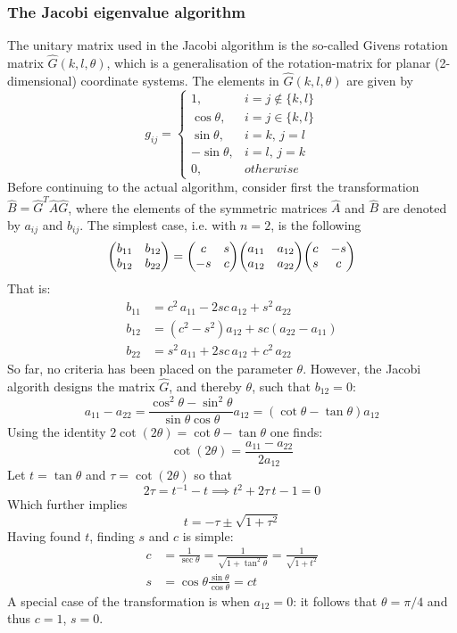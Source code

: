 \documentclass[reprint,english]{revtex4-1}
\begin{document}
\subsubsection{The Jacobi eigenvalue algorithm}
The unitary matrix used in the Jacobi algorithm is the so-called Givens rotation matrix \(\hat{G}(k,l,\theta)\), which is a generalisation of the rotation-matrix for planar (2-dimensional) coordinate systems. The elements in \(\hat{G}(k,l,\theta)\) are given by
\begin{equation}\label{eq:Givens_rotation_matrix}
g_{ij}=\begin{cases}1,&i=j\notin\{k,l\} \\ \cos\theta,&i=j\in\{k,l\} \\ \sin\theta,&i=k,\,j=l \\ -\sin\theta,&i=l,\,j=k \\ 0,&otherwise\end{cases}
\end{equation}
Before continuing to the actual algorithm, consider first the transformation \(\hat{B}=\hat{G}^T\hat{A}\hat{G}\), where the elements of the symmetric matrices \(\hat{A}\) and \(\hat{B}\) are denoted by \(a_{ij}\) and \(b_{ij}\). The simplest case, i.e. with \(n=2\), is the following
\[\mqty(b_{11}&b_{12}\\b_{12}&b_{22})=\mqty(c&s\\-s&c)\mqty(a_{11}&a_{12}\\a_{12}&a_{22})\mqty(c&-s\\s&c)\]
That is:
\begin{align*}
b_{11}&=c^2\,a_{11}-2sc\,a_{12}+s^2\,a_{22}\\
b_{12}&=(c^2-s^2)a_{12}+sc(a_{22}-a_{11})\\
b_{22}&=s^2\,a_{11}+2sc\,a_{12}+c^2\,a_{22}
\end{align*}
So far, no criteria has been placed on the parameter \(\theta\). However, the Jacobi algorith designs the matrix \(\hat{G}\), and thereby \(\theta\), such that \(b_{12}=0\):
\[a_{11}-a_{22}=\frac{\cos^2\theta-\sin^2\theta}{\sin\theta\cos\theta}a_{12}=(\cot\theta-\tan\theta)a_{12}\]
Using the identity \(2\cot(2\theta)=\cot\theta-\tan\theta\) one finds:
\[\cot(2\theta)=\frac{a_{11}-a_{22}}{2a_{12}}\]
Let \(t=\tan\theta\) and \(\tau=\cot(2\theta)\) so that
\[2\tau=t^{-1}-t\implies t^2+2\tau\,t-1=0\]
Which further implies
\begin{equation}\label{eq:jacobi_algorithm_t}
t=-\tau\pm\sqrt{1+\tau^2}
\end{equation}
Having found \(t\), finding \(s\) and \(c\) is simple:
\begin{subequations}\label{eq:jacobi_algorithm_cs}
\begin{align}
c&=\frac{1}{\sec\theta}=\frac{1}{\sqrt{1+\tan^2\theta}}=\frac{1}{\sqrt{1+t^2}}\\
s&=\cos\theta\frac{\sin\theta}{\cos\theta}=ct
\end{align}
\end{subequations}
A special case of the transformation is when \(a_{12}=0\): it follows that \(\theta=\pi/4\) and thus \(c=1\), \(s=0\).
\end{document}
